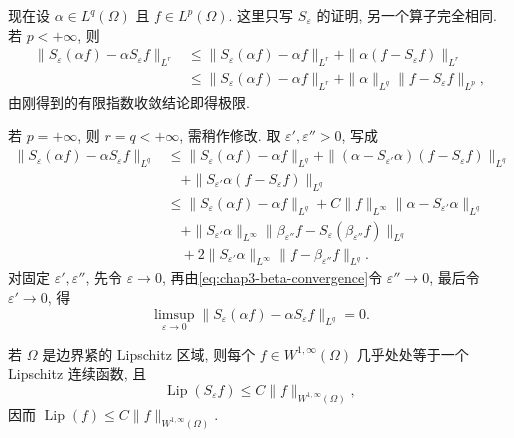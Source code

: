 \begin{Proof}
现在设 $\alpha\in L^q(\Omega)$ 且 $f\in L^p(\Omega)$. 这里只写 $S_\varepsilon$ 的证明, 另一个算子完全相同. 若 $p<+\infty$, 则
\[
\begin{aligned}
 \|S_\varepsilon(\alpha f)-\alpha S_\varepsilon f\|_{L^r}
 &\leq\|S_\varepsilon(\alpha f)-\alpha f\|_{L^r}
 +\|\alpha(f-S_\varepsilon f)\|_{L^r}\\
 &\leq\|S_\varepsilon(\alpha f)-\alpha f\|_{L^r}
 +\|\alpha\|_{L^q}\|f-S_\varepsilon f\|_{L^p},
\end{aligned}
\]
由刚得到的有限指数收敛结论即得极限.

若 $p=+\infty$, 则 $r=q<+\infty$, 需稍作修改. 取 $\varepsilon',\varepsilon''>0$, 写成
\[
\begin{aligned}
 \|S_\varepsilon(\alpha f)-\alpha S_\varepsilon f\|_{L^q}
 &\leq\|S_\varepsilon(\alpha f)-\alpha f\|_{L^q}
 +\|(\alpha-S_{\varepsilon'}\alpha)(f-S_\varepsilon f)\|_{L^q}\\
 &\quad+\|S_{\varepsilon'}\alpha(f-S_\varepsilon f)\|_{L^q}\\
 &\leq\|S_\varepsilon(\alpha f)-\alpha f\|_{L^q}
 +C\|f\|_{L^\infty}\|\alpha-S_{\varepsilon'}\alpha\|_{L^q}\\
 &\quad+\|S_{\varepsilon'}\alpha\|_{L^\infty}
 \|\beta_{\varepsilon''}f-S_\varepsilon(\beta_{\varepsilon''}f)\|_{L^q}\\
 &\quad+2\|S_{\varepsilon'}\alpha\|_{L^\infty}
 \|f-\beta_{\varepsilon''}f\|_{L^q}.
\end{aligned}
\]
对固定 $\varepsilon',\varepsilon''$, 先令 $\varepsilon\to0$, 再由\eqref{eq:chap3-beta-convergence}令 $\varepsilon''\to0$, 最后令 $\varepsilon'\to0$, 得
\[
 \limsup_{\varepsilon\to0}
 \|S_\varepsilon(\alpha f)-\alpha S_\varepsilon f\|_{L^q}=0.
\]
\end{Proof}

\begin{Proposition}
\label{prop:chap3-w1infty-lipschitz-representative}
若 $\Omega$ 是边界紧的 Lipschitz 区域, 则每个 $f\in W^{1,\infty}(\Omega)$ 几乎处处等于一个 Lipschitz 连续函数, 且
\begin{equation}
 \operatorname{Lip}(S_\varepsilon f)\leq C\|f\|_{W^{1,\infty}(\Omega)},
 \label{eq:chap3-mollified-lipschitz-bound}
\end{equation}
因而 $\operatorname{Lip}(f)\leq C\|f\|_{W^{1,\infty}(\Omega)}$.
\end{Proposition}

